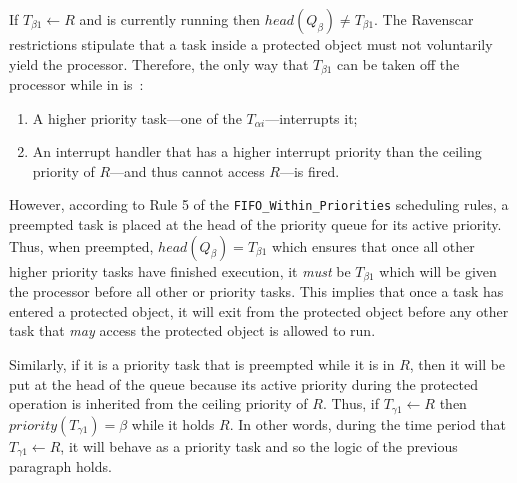 If $T_{\beta 1} \gets R$ and is currently running then $head(Q_\beta)
\neq T_{\beta 1}$. The Ravenscar restrictions stipulate that a task
inside a protected object must not voluntarily yield the
processor. Therefore, the only way that $T_{\beta 1}$ can be taken off
the processor while in \si is:

\begin{enumerate}
\item{A higher priority task---one of the $T_{\alpha i}$---interrupts
  it;}
\item{An interrupt handler that has a higher interrupt priority than
  the ceiling priority of $R$---and thus cannot access $R$---is
  fired.}
\end{enumerate}

However, according to Rule 5 of the \texttt{FIFO\_Within\_Priorities}
scheduling rules, a preempted task is placed at the head of the
priority queue for its active priority. Thus, when preempted,
$head(Q_{\beta}) = T_{\beta 1}$ which ensures that once all other
higher priority tasks have finished execution, it \emph{must} be
$T_{\beta 1}$ which will be given the processor before all other \be
or \ga priority tasks. This implies that once a task has entered a
protected object, it will exit from the protected object before any
other task that \emph{may} access the protected object is allowed to
run.

Similarly, if it is a \ga priority task that is preempted while it is
in $R$, then it will be put at the head of the \be queue because its
active priority during the protected operation is inherited from the
ceiling priority of $R$. Thus, if $T_{\gamma 1} \gets R$ then
$priority(T_{\gamma 1}) = \beta$ while it holds $R$. In other words,
during the time period that $T_{\gamma 1} \gets R$, it will behave as
a \be priority task and so the logic of the previous paragraph holds.

